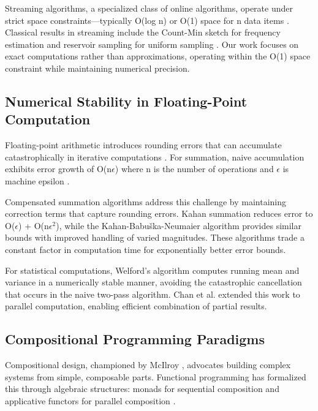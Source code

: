 \documentclass[sigconf]{acmart}
\begin{document}
Streaming algorithms, a specialized class of online algorithms, operate under strict space constraints---typically O(log n) or O(1) space for n data items \cite{alon1996space}. Classical results in streaming include the Count-Min sketch for frequency estimation \cite{cormode2005improved} and reservoir sampling for uniform sampling \cite{vitter1985random}. Our work focuses on exact computations rather than approximations, operating within the O(1) space constraint while maintaining numerical precision.

\subsection{Numerical Stability in Floating-Point Computation}

Floating-point arithmetic introduces rounding errors that can accumulate catastrophically in iterative computations \cite{goldberg1991every}. For summation, naive accumulation exhibits error growth of O(n$\epsilon$) where n is the number of operations and $\epsilon$ is machine epsilon \cite{higham2002accuracy}.

Compensated summation algorithms address this challenge by maintaining correction terms that capture rounding errors. Kahan summation \cite{kahan1965pracniques} reduces error to O($\epsilon$) + O(n$\epsilon^2$), while the Kahan-Babuška-Neumaier algorithm \cite{neumaier1974rundungsfehleranalyse} provides similar bounds with improved handling of varied magnitudes. These algorithms trade a constant factor in computation time for exponentially better error bounds.

For statistical computations, Welford's algorithm \cite{welford1962note} computes running mean and variance in a numerically stable manner, avoiding the catastrophic cancellation that occurs in the naive two-pass algorithm. Chan et al. \cite{chan1983algorithms} extended this work to parallel computation, enabling efficient combination of partial results.

\subsection{Compositional Programming Paradigms}

Compositional design, championed by McIlroy \cite{mcilroy1969mass}, advocates building complex systems from simple, composable parts. Functional programming has formalized this through algebraic structures: monads for sequential composition \cite{wadler1995monads} and applicative functors for parallel composition \cite{mcbride2008applicative}.
\end{document}
